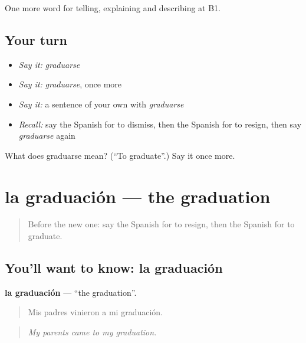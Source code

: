 \begin{grammarlens}[title={What you've built}]
One more word for telling, explaining and describing at B1.
\end{grammarlens}

\subsection*{Your turn}
\begin{itemize}
\raggedright
  \item \emph{Say it:} \emph{graduarse}
  \item \emph{Say it:} \emph{graduarse}, once more
  \item \emph{Say it:} a sentence of your own with \emph{graduarse}
  \item \emph{Recall:} say the Spanish for to dismiss, then the Spanish for to resign, then say \emph{graduarse} again
\end{itemize}

\begin{tcolorbox}[breakable,colback=teal!4,colframe=teal!35!black,title={Before you move on}]
What does graduarse mean? (\textquotedblleft{}To graduate\textquotedblright{}.) Say it once more.
\end{tcolorbox}
\section[la graduación]{la graduación — the graduation}

\label{lesson:ES-C554-graduacion}



\begin{quote}
Before the new one: say the Spanish for to resign, then the Spanish for to graduate.
\end{quote}

\subsection*{You'll want to know: la graduación}
\textbf{la graduación} — \textquotedblleft{}the graduation\textquotedblright{}.

\begin{quote}
Mis padres vinieron a mi graduación.
\end{quote}

\begin{quote}
\emph{My parents came to my graduation.}
\end{quote}

